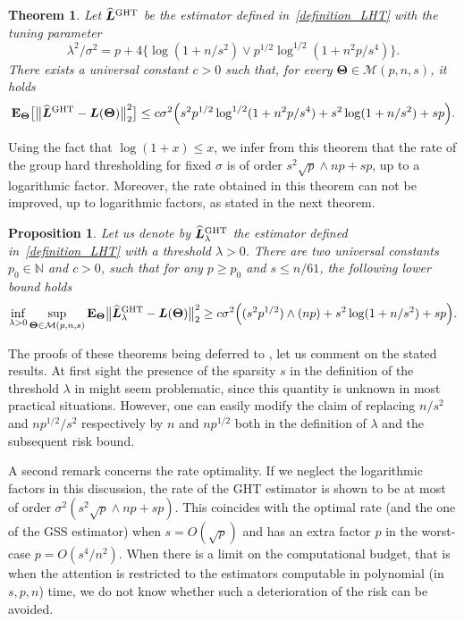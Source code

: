 \documentclass[sts,preprint,reqno,a4paper]{imsart}
\def\l{\lambda}
\def\s{\sigma}
\def\NN{\mathbb N}
\def\bL{\boldsymbol L}
\def\bfT{\mathbf\Theta}
\def\esp{\mathbf E}
\def\calM{\mathcal M}
\def\hat{\widehat}
\theoremstyle{plain}
\newtheorem{theorem}{Theorem}
\newtheorem{proposition}{Proposition}
\theoremstyle{remark}
\theoremstyle{definition}
\begin{document}
\begin{theorem}\label{theorem_HT}
	Let $\hat{\bL}{}^{\rm GHT}$ be the estimator defined in~\eqref{definition_LHT} with the tuning parameter
	\begin{equation}
		\lambda^2/\sigma^2 = p+4\big\{\log(1+n/s^2)\vee p^{1/2}\log^{1/2}(1+n^2p/s^4)\big\}.
	\end{equation}
	There exists a universal constant $c>0$ such that, for every
	$\bfT\in\calM(p,n,s)$, it holds
	\begin{equation}
		\esp_\bfT\big[\big\| \hat{\bL}{}^{\rm GHT}-\bL(\bfT) \big\|_2^2\big] \le 
		c\sigma^2\Big(s^2p^{1/2}\log^{1/2}(1+n^2p/s^4)+s^2\log(1+n/s^2)+sp\Big).
	\end{equation}
\end{theorem}
Using the fact that $\log(1+x)\le x$, we infer from this theorem that the rate of the 
group hard thresholding for fixed $\s$ is of order $s^2\sqrt{p}\wedge np+sp$, up to 
a logarithmic factor. Moreover, the rate obtained in this theorem can not be improved, 
up to logarithmic factors, as stated in the next theorem.
\begin{proposition}\label{theorem_HT_lowerbound}
Let us denote by $\hat{\bL}{}^{\rm GHT}_\l$ the estimator defined in~\eqref{definition_LHT} with a threshold $\l>0$. There are two universal constants $p_0\in\NN$ and $c>0$, such that for any $p\ge p_0$ and $s\le n/61$, the following lower bound holds
	\begin{equation}
		\inf_{\l>0}\sup_{\bfT\in\calM(p,n,s)} \esp_\bfT \big\| \hat{\bL}{}^{\rm GHT}_\l-\bL(\bfT) \big\|_2^2 \ge c\sigma^2\Big((s^2p^{1/2})\wedge (np)+s^2\log(1+n/s^2)+sp\Big).
	\end{equation}
\end{proposition}


The proofs of these theorems being deferred to , let us
comment on the stated results. At first sight the presence of the sparsity $s$
in the definition of the threshold $\l$ in  might seem
problematic, since this quantity is unknown in most practical situations.
However, one can easily modify the claim of  replacing $n/s^2$
and $np^{1/2}/s^2$ respectively by $n$ and $np^{1/2}$ both in the definition of
$\l$ and the subsequent risk bound.

A second remark concerns the rate optimality. If we neglect the logarithmic factors in this discussion, the rate of the GHT estimator is shown to be at
most of order $\sigma^2(s^2\sqrt{p}\wedge np +sp)$. This coincides with the optimal rate
(and the one of the GSS estimator) when $s = O(\sqrt{p})$ and has an extra
factor $p$ in the worst-case $p = O(s^4/n^2)$. When there is a limit on the
computational budget, that is when the attention is restricted to the
estimators computable in polynomial (in $s,p,n$) time, we do not know whether
such a deterioration of the risk can be avoided.
\end{document}
